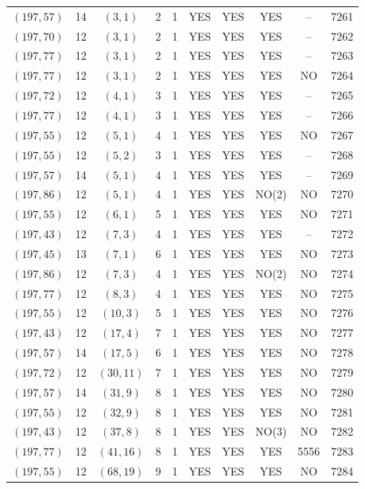 \begin{longtable}{|c|c|c|c|c|c|c|c|c|c|}
$(197, 57)$ & 14 & $(3, 1)$ & 2 & 1 & YES & YES & YES & -- & 7261\\
$(197, 70)$ & 12 & $(3, 1)$ & 2 & 1 & YES & YES & YES & -- & 7262\\
$(197, 77)$ & 12 & $(3, 1)$ & 2 & 1 & YES & YES & YES & -- & 7263\\
$(197, 77)$ & 12 & $(3, 1)$ & 2 & 1 & YES & YES & YES & NO & 7264\\
$(197, 72)$ & 12 & $(4, 1)$ & 3 & 1 & YES & YES & YES & -- & 7265\\
$(197, 77)$ & 12 & $(4, 1)$ & 3 & 1 & YES & YES & YES & -- & 7266\\
$(197, 55)$ & 12 & $(5, 1)$ & 4 & 1 & YES & YES & YES & NO & 7267\\
$(197, 55)$ & 12 & $(5, 2)$ & 3 & 1 & YES & YES & YES & -- & 7268\\
$(197, 57)$ & 14 & $(5, 1)$ & 4 & 1 & YES & YES & YES & -- & 7269\\
$(197, 86)$ & 12 & $(5, 1)$ & 4 & 1 & YES & YES & NO(2) & NO & 7270\\
$(197, 55)$ & 12 & $(6, 1)$ & 5 & 1 & YES & YES & YES & NO & 7271\\
$(197, 43)$ & 12 & $(7, 3)$ & 4 & 1 & YES & YES & YES & -- & 7272\\
$(197, 45)$ & 13 & $(7, 1)$ & 6 & 1 & YES & YES & YES & NO & 7273\\
$(197, 86)$ & 12 & $(7, 3)$ & 4 & 1 & YES & YES & NO(2) & NO & 7274\\
$(197, 77)$ & 12 & $(8, 3)$ & 4 & 1 & YES & YES & YES & NO & 7275\\
$(197, 55)$ & 12 & $(10, 3)$ & 5 & 1 & YES & YES & YES & NO & 7276\\
$(197, 43)$ & 12 & $(17, 4)$ & 7 & 1 & YES & YES & YES & NO & 7277\\
$(197, 57)$ & 14 & $(17, 5)$ & 6 & 1 & YES & YES & YES & NO & 7278\\
$(197, 72)$ & 12 & $(30, 11)$ & 7 & 1 & YES & YES & YES & NO & 7279\\
$(197, 57)$ & 14 & $(31, 9)$ & 8 & 1 & YES & YES & YES & NO & 7280\\
$(197, 55)$ & 12 & $(32, 9)$ & 8 & 1 & YES & YES & YES & NO & 7281\\
$(197, 43)$ & 12 & $(37, 8)$ & 8 & 1 & YES & YES & NO(3) & NO & 7282\\
$(197, 77)$ & 12 & $(41, 16)$ & 8 & 1 & YES & YES & YES & 5556 & 7283\\
$(197, 55)$ & 12 & $(68, 19)$ & 9 & 1 & YES & YES & YES & NO & 7284\\

\end{longtable}
